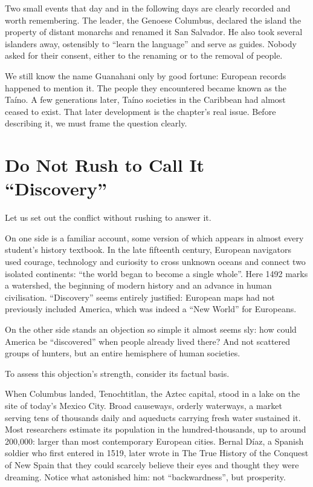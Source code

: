 Two small events that day and in the following days are clearly recorded and worth remembering. The leader, the Genoese Columbus, declared the island the property of distant monarchs and renamed it San Salvador. He also took several islanders away, ostensibly to ``learn the language'' and serve as guides. Nobody asked for their consent, either to the renaming or to the removal of people.

We still know the name Guanahani only by good fortune: European records happened to mention it. The people they encountered became known as the Taíno. A few generations later, Taíno societies in the Caribbean had almost ceased to exist. That later development is the chapter's real issue. Before describing it, we must frame the question clearly.

\section{Do Not Rush to Call It ``Discovery''}
Let us set out the conflict without rushing to answer it.

On one side is a familiar account, some version of which appears in almost every student's history textbook. In the late fifteenth century, European navigators used courage, technology and curiosity to cross unknown oceans and connect two isolated continents: ``the world began to become a single whole''. Here 1492 marks a watershed, the beginning of modern history and an advance in human civilisation. ``Discovery'' seems entirely justified: European maps had not previously included America, which was indeed a ``New World'' for Europeans.

On the other side stands an objection so simple it almost seems sly: how could America be ``discovered'' when people already lived there? And not scattered groups of hunters, but an entire hemisphere of human societies.

To assess this objection's strength, consider its factual basis.

When Columbus landed, Tenochtitlan, the Aztec capital, stood in a lake on the site of today's Mexico City. Broad causeways, orderly waterways, a market serving tens of thousands daily and aqueducts carrying fresh water sustained it. Most researchers estimate its population in the hundred-thousands, up to around 200,000: larger than most contemporary European cities. Bernal Díaz, a Spanish soldier who first entered in 1519, later wrote in The True History of the Conquest of New Spain that they could scarcely believe their eyes and thought they were dreaming. Notice what astonished him: not ``backwardness'', but prosperity.


